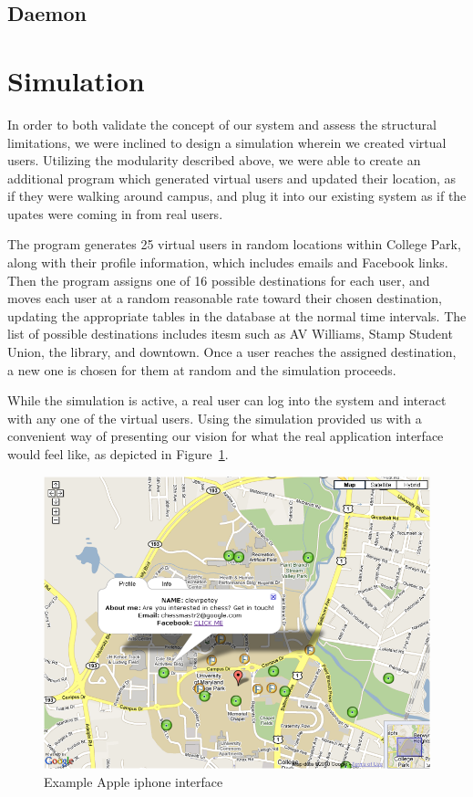 \documentclass[11pt]{article}
\begin{document}


\subsection{Daemon}


\section{Simulation}


In order to both validate the concept of our system and assess the structural limitations, we were inclined to design a simulation wherein we created virtual users. Utilizing the modularity described above, we were able to create an additional program which generated virtual users and updated their location, as if they were walking around campus, and plug it into our existing system as if the upates were coming in from real users. 

The program generates 25 virtual users in random locations within College Park, along with their profile information, which includes emails and Facebook links. Then the program assigns one of 16 possible destinations for each user, and moves each user at a random reasonable rate toward their chosen destination, updating the appropriate tables in the database at the normal time intervals. The list of possible destinations includes itesm such as AV Williams, Stamp Student Union, the library, and downtown. Once a user reaches the assigned destination, a new one is chosen for them at random and the simulation proceeds. 

While the simulation is active, a real user can log into the system and interact with any one of the virtual users. Using the simulation provided us with a convenient way of presenting our vision for what the real application interface would feel like, as depicted in Figure~\ref{fig:sim1}. 


\begin{figure}[h]
\begin{center}
  \includegraphics[scale=0.5]{sim1.png}
\caption{Example Apple iphone interface}
\label{fig:sim1} 
\end{center}
\end{figure}
\end{document}
